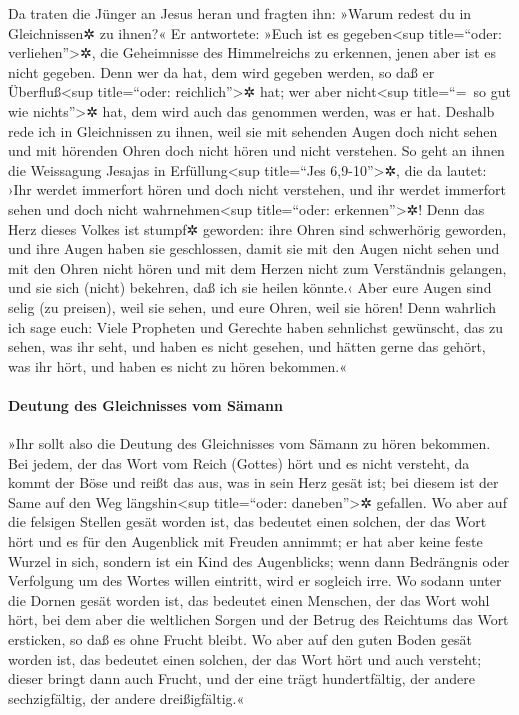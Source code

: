  Da traten die Jünger an Jesus heran und fragten ihn:
»Warum redest du in Gleichnissen✲ zu ihnen?«  Er
antwortete: »Euch ist es gegeben\textless sup title=``oder:
verliehen''\textgreater✲, die Geheimnisse des Himmelreichs zu erkennen,
jenen aber ist es nicht gegeben.  Denn wer da hat, dem
wird gegeben werden, so daß er Überfluß\textless sup title=``oder:
reichlich''\textgreater✲ hat; wer aber nicht\textless sup title=``=~so
gut wie nichts''\textgreater✲ hat, dem wird auch das genommen werden,
was er hat.  Deshalb rede ich in Gleichnissen zu ihnen,
weil sie mit sehenden Augen doch nicht sehen und mit hörenden Ohren doch
nicht hören und nicht verstehen.  So geht an ihnen die
Weissagung Jesajas in Erfüllung\textless sup title=``Jes
6,9-10''\textgreater✲, die da lautet: ›Ihr werdet immerfort hören und
doch nicht verstehen, und ihr werdet immerfort sehen und doch nicht
wahrnehmen\textless sup title=``oder: erkennen''\textgreater✲!
 Denn das Herz dieses Volkes ist stumpf✲ geworden: ihre
Ohren sind schwerhörig geworden, und ihre Augen haben sie geschlossen,
damit sie mit den Augen nicht sehen und mit den Ohren nicht hören und
mit dem Herzen nicht zum Verständnis gelangen, und sie sich (nicht)
bekehren, daß ich sie heilen könnte.‹  Aber eure Augen
sind selig (zu preisen), weil sie sehen, und eure Ohren, weil sie hören!
 Denn wahrlich ich sage euch: Viele Propheten und
Gerechte haben sehnlichst gewünscht, das zu sehen, was ihr seht, und
haben es nicht gesehen, und hätten gerne das gehört, was ihr hört, und
haben es nicht zu hören bekommen.«

\hypertarget{deutung-des-gleichnisses-vom-suxe4mann}{%
\paragraph{Deutung des Gleichnisses vom
Sämann}\label{deutung-des-gleichnisses-vom-suxe4mann}}

 »Ihr sollt also die Deutung des Gleichnisses vom Sämann
zu hören bekommen.  Bei jedem, der das Wort vom Reich
(Gottes) hört und es nicht versteht, da kommt der Böse und reißt das
aus, was in sein Herz gesät ist; bei diesem ist der Same auf den Weg
längshin\textless sup title=``oder: daneben''\textgreater✲ gefallen.
 Wo aber auf die felsigen Stellen gesät worden ist, das
bedeutet einen solchen, der das Wort hört und es für den Augenblick mit
Freuden annimmt;  er hat aber keine feste Wurzel in sich,
sondern ist ein Kind des Augenblicks; wenn dann Bedrängnis oder
Verfolgung um des Wortes willen eintritt, wird er sogleich irre.
 Wo sodann unter die Dornen gesät worden ist, das
bedeutet einen Menschen, der das Wort wohl hört, bei dem aber die
weltlichen Sorgen und der Betrug des Reichtums das Wort ersticken, so
daß es ohne Frucht bleibt.  Wo aber auf den guten Boden
gesät worden ist, das bedeutet einen solchen, der das Wort hört und auch
versteht; dieser bringt dann auch Frucht, und der eine trägt
hundertfältig, der andere sechzigfältig, der andere dreißigfältig.«

